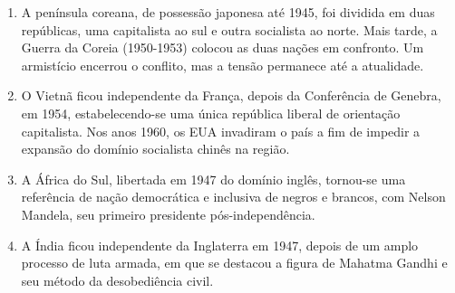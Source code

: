 \begin{enumerate}
\item A península coreana, de possessão japonesa até 1945, foi dividida em duas repúblicas, uma capitalista ao sul
      e outra socialista ao norte. Mais tarde, a Guerra da Coreia (1950-1953) colocou as duas nações em confronto.
      Um armistício encerrou o conflito, mas a tensão permanece até a atualidade.
\item O Vietnã ficou independente da França, depois da Conferência de Genebra, em 1954, estabelecendo-se uma
      única república liberal de orientação capitalista. Nos anos 1960, os EUA invadiram o país a fim de impedir a
      expansão do domínio socialista chinês na região.
\item A África do Sul, libertada em 1947 do domínio inglês, tornou-se uma referência de nação democrática e
      inclusiva de negros e brancos, com Nelson Mandela, seu primeiro presidente pós-independência.
\item A Índia ficou independente da Inglaterra em 1947, depois de um amplo processo de luta armada, em que se
      destacou a figura de Mahatma Gandhi e seu método da desobediência civil.\end{enumerate}
